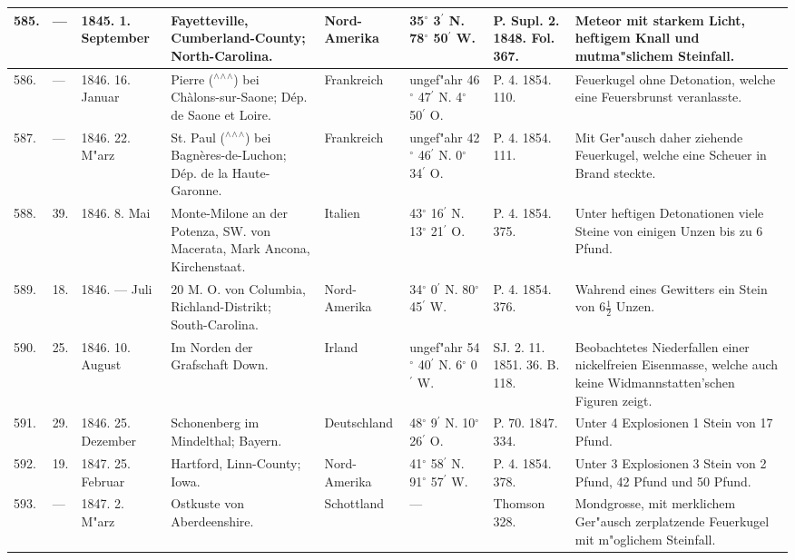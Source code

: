 \documentclass[a4paper, 8pt, oneside, polutonikogreek, german]{article}
\begin{document}
\begin{center}
\begin{longtable}{| p{5mm} | p{3mm} | p{15mm} | p{25mm} | p{20mm} | p{14mm} | p{17mm} | p{24mm} |}
        585. & --- & 1845. 1. September & Fayetteville, Cumberland-County; North-Carolina. & Nord-Amerika & 35$^\circ$ 3$^\prime$ N. 78$^\circ$ 50$^\prime$ W. & P. Supl. 2. 1848. Fol. 367. & Meteor mit starkem Licht, heftigem Knall und mutma"slichem Steinfall. \\ \hline
        586. & --- & 1846. 16. Januar & Pierre ($^\wedge$$^\wedge$$^\wedge$) bei Chàlons-sur-Saone; Dép. de Saone et Loire. & Frankreich & ungef"ahr 46$^\circ$ 47$^\prime$ N. 4$^\circ$ 50$^\prime$ O. & P. 4. 1854. 110. & Feuerkugel ohne Detonation, welche eine Feuersbrunst veranlasste. \\ \hline
        587. & --- & 1846. 22. M"arz & St. Paul ($^\wedge$$^\wedge$$^\wedge$) bei Bagnères-de-Luchon; Dép. de la Haute-Garonne. & Frankreich & ungef"ahr 42$^\circ$ 46$^\prime$ N. 0$^\circ$ 34$^\prime$ O. & P. 4. 1854. 111. & Mit Ger"ausch daher ziehende Feuerkugel, welche eine Scheuer in Brand steckte. \\ \hline
        588. & 39. & 1846. 8. Mai & Monte-Milone an der Potenza, SW. von Macerata, Mark Ancona, Kirchenstaat. & Italien & 43$^\circ$ 16$^\prime$ N. 13$^\circ$ 21$^\prime$ O. & P. 4. 1854. 375. & Unter heftigen Detonationen viele Steine von einigen Unzen bis zu 6 Pfund. \\ \hline
        589. & 18. & 1846. --- Juli & 20 M. O. von Columbia, Richland-Distrikt; South-Carolina. & Nord-Amerika & 34$^\circ$ 0$^\prime$ N. 80$^\circ$ 45$^\prime$ W. & P. 4. 1854. 376. & Wahrend eines Gewitters ein Stein von $6\frac{1}{2}$ Unzen. \\ \hline
        590. & 25. & 1846. 10. August & Im Norden der Grafschaft Down. & Irland & ungef"ahr 54$^\circ$ 40$^\prime$ N. 6$^\circ$ 0$^\prime$ W. & SJ. 2. 11. 1851. 36. B. 118. & Beobachtetes Niederfallen einer nickelfreien Eisenmasse, welche auch keine Widmannstatten'schen Figuren zeigt. \\ \hline
        591. & 29. & 1846. 25. Dezember & Schonenberg im Mindelthal; Bayern. & Deutschland & 48$^\circ$ 9$^\prime$ N. 10$^\circ$ 26$^\prime$ O. & P. 70. 1847. 334. & Unter 4 Explosionen 1 Stein von 17 Pfund. \\ \hline
        592. & 19. & 1847. 25. Februar & Hartford, Linn-County; Iowa. & Nord-Amerika & 41$^\circ$ 58$^\prime$ N. 91$^\circ$ 57$^\prime$ W. & P. 4. 1854. 378. & Unter 3 Explosionen 3 Stein von 2 Pfund, 42 Pfund und 50 Pfund. \\ \hline
        593. & --- & 1847. 2. M"arz & Ostkuste von Aberdeenshire. & Schottland & --- & Thomson 328. & Mondgrosse, mit merklichem Ger"ausch zerplatzende Feuerkugel mit m"oglichem Steinfall. \\ \hline

\end{longtable}
\end{center}
\end{document}
